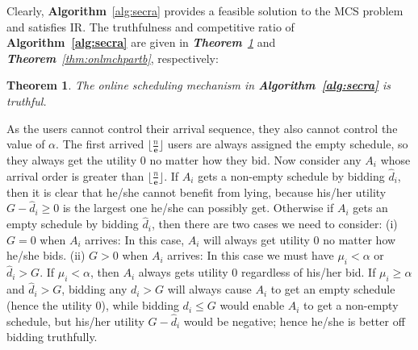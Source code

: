 \documentclass[10pt,journal,compsoc]{IEEEtran}
\newtheorem{theorem}{\textbf{Theorem}}
\begin{document}
  Clearly, \textbf{Algorithm}~\ref{alg:secra} provides a feasible solution to the MCS problem and satisfies IR. The truthfulness and competitive ratio of \textbf{Algorithm~\ref{alg:secra}} are given in \textit{\textbf{Theorem}~\ref{thm:secrtruthful}} and \textit{\textbf{Theorem}~\ref{thm:onlmchpartb}}, respectively:
\begin{theorem}
    The online scheduling mechanism in \textbf{Algorithm~\ref{alg:secra}} is truthful.
    \label{thm:secrtruthful}
  \end{theorem}
\begin{IEEEproof}
    As the users cannot control their arrival sequence, they also cannot control the value of $\alpha$. The first arrived $\lfloor \frac{n}{\mathbf{e}}\rfloor$ users are always assigned the empty schedule, so they always get the utility 0 no matter how they bid. Now consider any $A_i$ whose arrival order is greater than $\lfloor \frac{n}{\mathbf{e}}\rfloor$. If $A_i$ gets a non-empty schedule by bidding $\hat{d}_i$, then it is clear that he/she cannot benefit from lying, because his/her utility $G-\hat{d}_i\geq 0$ is the largest one he/she can possibly get. Otherwise if $A_i$ gets an empty schedule by bidding $\hat{d}_i$, then there are two cases we need to consider: (i) $G=0$ when $A_i$ arrives: In this case, $A_i$ will always get utility 0 no matter how he/she bids. (ii) $G>0$ when $A_i$ arrives: In this case we must have $\mu_i<\alpha$ or $\hat{d}_i>G$. If $\mu_i< \alpha$, then $A_i$ always gets utility 0 regardless of his/her bid. If $\mu_i\geq \alpha$ and $\hat{d}_i> G$, bidding any $d_i>G$ will always cause $A_i$ to get an empty schedule (hence the utility 0), while bidding $d_i\leq G$ would enable $A_i$ to get a non-empty schedule, but his/her utility $G-\hat{d}_i$ would be negative; hence he/she is better off bidding truthfully.
\end{IEEEproof}
\end{document}
